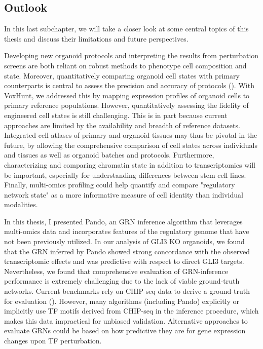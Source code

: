 \subsection{Outlook}

In this last subchapter, we will take a closer look at some central topics of this thesis and discuss their limitations and future perspectives.

Developing new organoid protocols and interpreting the results from perturbation screens are both reliant on robust methods to phenotype cell composition and state. Moreover, quantitatively comparing organoid cell states with primary counterparts is central to assess the precision and accuracy of protocols (\cite{camp_single-cell_2018}). With VoxHunt, we addressed this by mapping expression profiles of organoid cells to primary reference populations. However, quantitatively assessing the fidelity of engineered cell states is still challenging. This is in part because current approaches are limited by the availability and breadth of reference datasets. Integrated cell atlases of primary and organoid tissues may thus be pivotal in the future, by allowing the comprehensive comparison of cell states across individuals and tissues as well as organoid batches and protocols. Furthermore, characterizing and comparing chromatin state in addition to transcriptomics will be important, especially for understanding differences between stem cell lines. Finally, multi-omics profiling could help quantify and compare "regulatory network state" as a more informative measure of cell identity than individual modalities.


In this thesis, I presented Pando, an GRN inference algorithm that leverages multi-omics data and incorporates features of the regulatory genome that have not been previously utilized. In our analysis of GLI3 KO organoids, we found that the GRN inferred by Pando showed strong concordance with the observed transcriptomic effects and was predictive with respect to direct GLI3 targets. Nevertheless, we found that comprehensive evaluation of GRN-inference performance is extremely challenging due to the lack of viable ground-truth networks. Current benchmarks rely on CHIP-seq data to derive a ground-truth for evaluation (\cite{pratapa_benchmarking_2020}). However, many algorithms (including Pando) explicitly or implicitly use TF motifs derived from CHIP-seq in the inference procedure, which makes this data impractical for unbiased validation. Alternative approaches to evaluate GRNs could be based on how predictive they are for gene expression changes upon TF perturbation. 

